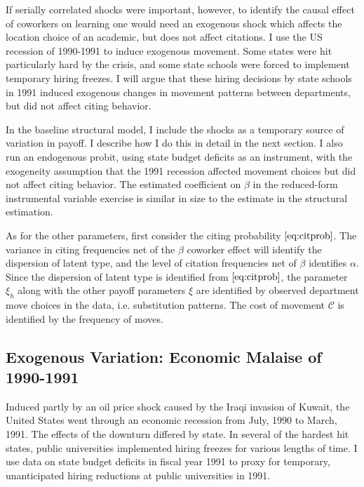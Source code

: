 If serially correlated shocks were important, however, to identify the
causal effect of coworkers on learning one would need an exogenous shock
which affects the location choice of an academic, but does not affect
citations.  I use the US recession of 1990-1991 to induce exogenous
movement. Some states were hit particularly hard by the crisis, and some
state schools were forced to implement temporary hiring freezes. I will
argue that these hiring decisions by state schools in 1991 induced
exogenous changes in movement patterns between departments, but did not
affect citing behavior.

In the baseline structural model, I include the shocks as a temporary
source of variation in payoff. I describe how I do this in detail
in the next section.  I also run an endogenous probit, using state budget
deficits as an instrument, with the exogeneity assumption that the 1991
recession affected movement choices but did not affect citing behavior.\footnotemark{}
The estimated coefficient on $\beta$ in the reduced-form instrumental variable
exercise is similar in size to the estimate in the structural 
estimation.

As for the other parameters, first consider the citing probability
$\eqref{eq:citprob}$. The variance in citing frequencies net of the
$\beta$ coworker effect will identify the dispersion of latent type, and
the level of citation frequencies net of $\beta$ identifies $\alpha$.
Since the dispersion of latent type is identified from
$\eqref{eq:citprob}$, the parameter $\xi_h$ along with the other payoff
parameters $\xi$ are identified by observed department move choices in the data, i.e.
substitution patterns. The cost of movement $\mathcal{C}$ is
identified by the frequency of moves.

\subsection{Exogenous Variation: Economic Malaise of 1990-1991}

Induced partly by an oil price shock caused by the Iraqi invasion of
Kuwait, the United States went through an economic recession from July,
1990 to March, 1991. The effects of the downturn differed by state.
\citep{wapo1991public, moore1991state} In several of the hardest hit
states, public universities implemented hiring freezes for various
lengths of time.\citep{latimes1991golden, moneymag1991paying, uvt2013pres}
I use data on state budget deficits in fiscal year 1991 to proxy for
temporary, unanticipated hiring reductions at public universities in
1991.\citep{gold1995fiscal}

